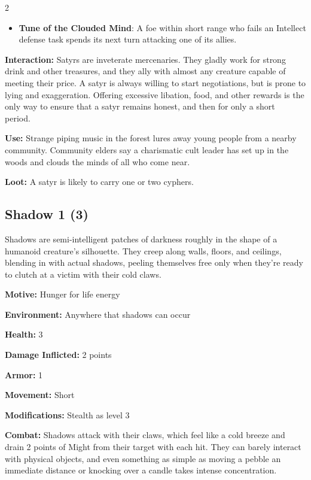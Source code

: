 \begin{multicols}{2}
\begin{itemize}
\item \textbf{Tune of the Clouded Mind}: A foe within short range who fails an Intellect defense task spends its next turn attacking one of its allies. 
\end{itemize}

\textbf{Interaction:} Satyrs are inveterate mercenaries. They gladly work for strong drink and other treasures, and they ally with almost any creature capable of meeting their price. A satyr is always willing to start negotiations, but is prone to lying and exaggeration. Offering excessive libation, food, and other rewards is the only way to ensure that a satyr remains honest, and then for only a short period. 

\textbf{Use:} Strange piping music in the forest lures away young people from a nearby community. Community elders say a charismatic cult leader has set up in the woods and clouds the minds of all who come near. 

\textbf{Loot:} A satyr is likely to carry one or two cyphers.

\subsection{Shadow 1 (3)}

Shadows are semi-intelligent patches of darkness roughly in the shape of a humanoid creature’s silhouette. They creep along walls, floors, and ceilings, blending in with actual shadows, peeling themselves free only when they’re ready to clutch at a victim with their cold claws. 

\textbf{Motive:} Hunger for life energy 

\textbf{Environment:} Anywhere that shadows can occur 

\textbf{Health:} 3 

\textbf{Damage Inflicted:} 2 points 

\textbf{Armor:} 1 

\textbf{Movement:} Short 

\textbf{Modifications:} Stealth as level 3 

\textbf{Combat:} Shadows attack with their claws, which feel like a cold breeze and drain 2 points of Might from their target with each hit. They can barely interact with physical objects, and even something as simple as moving a pebble an immediate distance or knocking over a candle takes intense concentration. 


\end{multicols}
